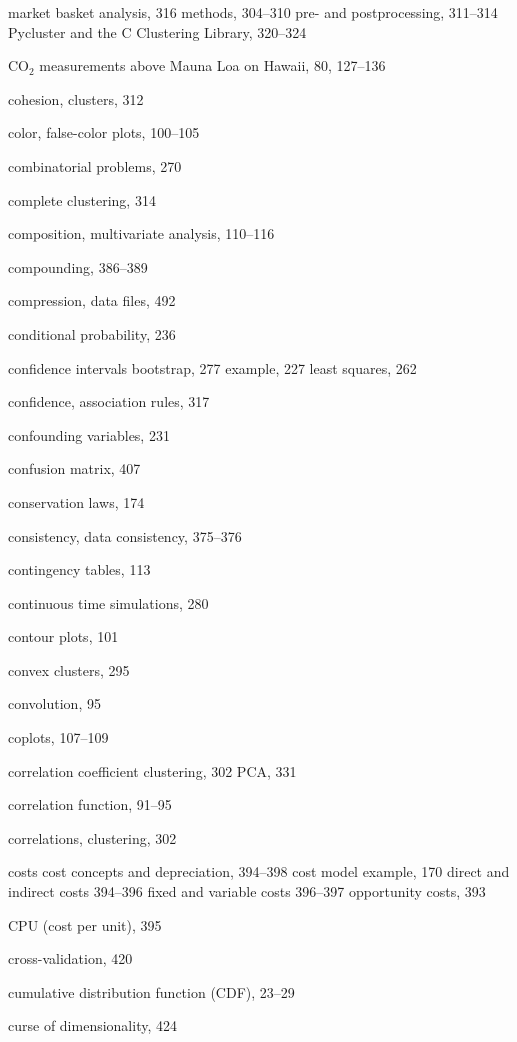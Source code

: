 \documentclass{Oreilly5980006}
\begin{document}
\begin{theindex}
    \subitem market basket analysis, 316
    \subitem methods, 304--310
    \subitem pre- and postprocessing, 311--314
    \subitem Pycluster and the C Clustering Library, 320--324
  \item $\mathrm{CO_2}$ measurements above Mauna Loa on Hawaii, 80, 127--136
  \item cohesion, clusters, 312
  \item color, false-color plots, 100--105
  \item combinatorial problems, 270
  \item complete clustering, 314
  \item composition, multivariate analysis, 110--116
  \item compounding, 386--389
  \item compression, data files, 492
  \item conditional probability, 236
  \item confidence intervals
    \subitem bootstrap, 277
    \subitem example, 227
    \subitem least squares, 262
  \item confidence, association rules, 317
  \item confounding variables, 231
  \item confusion matrix, 407
  \item conservation laws, 174
  \item consistency, data consistency, 375--376
  \item contingency tables, 113
  \item continuous time simulations, 280
  \item contour plots, 101
  \item convex clusters, 295
  \item convolution, 95
  \item coplots, 107--109
  \item correlation coefficient
    \subitem clustering, 302
    \subitem PCA, 331
  \item correlation function, 91--95
  \item correlations, clustering, 302
  \item costs
    \subitem cost concepts and depreciation, 394--398
    \subitem cost model example, 170
    \subitem  direct and indirect costs 394--396
    \subitem  fixed and variable costs 396--397
    \subitem opportunity costs, 393
  \item CPU (cost per unit), 395
  \item cross-validation, 420
  \item cumulative distribution function (CDF), 23--29
  \item curse of dimensionality, 424


\end{theindex}
\end{document}
